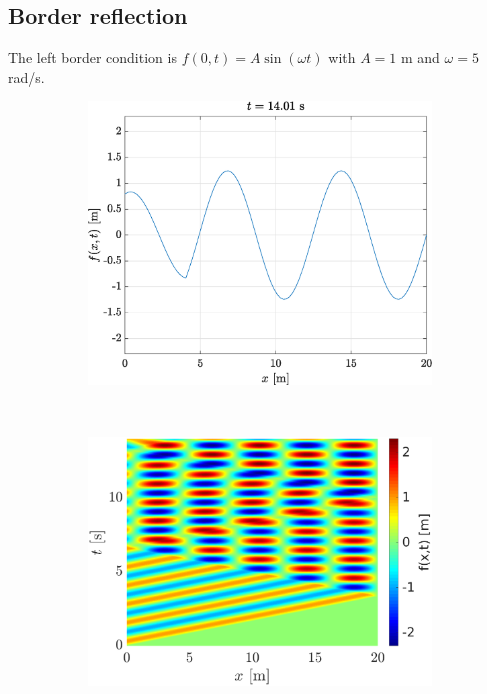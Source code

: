 \documentclass[a4paper,12pt,twoside]{article}
\begin{document}
    \subsection{Border reflection}
    The left border condition is $f(0,t)=A\sin(\omega t)$ with $A=1$ m and $\omega=5$ rad/s.

    \begin{figure}[h!]
    \begin{subfigure}{0.5\textwidth}
    \includegraphics[width=\textwidth]{graphs/ex1ffixe.eps}
    \end{subfigure}
    ~
    \begin{subfigure}{0.55\textwidth}
    \includegraphics[width=\textwidth]{graphs/ex1xtfixe.eps}
    \end{subfigure}\


\end{figure}
\end{document}
